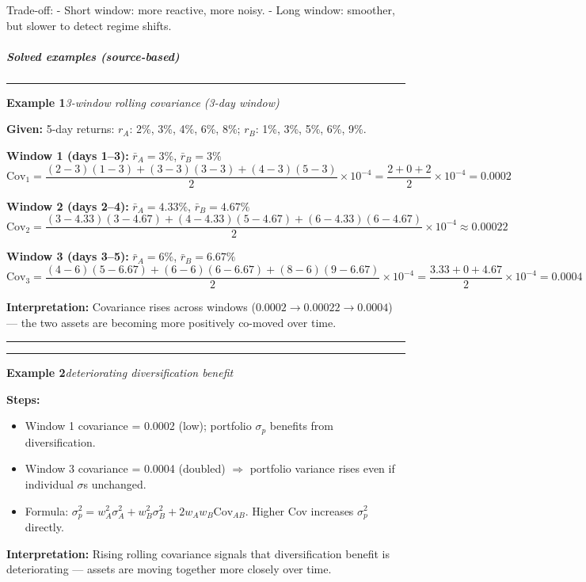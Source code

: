 \documentclass[
]{article}
\begin{document}
Trade-off: - Short window: more reactive, more noisy. - Long window:
smoother, but slower to detect regime shifts.

\hypertarget{solved-examples-source-based-6}{%
\subparagraph{Solved examples
(source-based)}\label{solved-examples-source-based-6}}



\medskip
\noindent\rule{\linewidth}{0.4pt}
\noindent\textbf{Example 1}\enspace\textit{3-window rolling covariance (3-day window)}

\noindent\textbf{Given:} 5-day returns: $r_A$: 2\%, 3\%, 4\%, 6\%, 8\%; $r_B$: 1\%, 3\%, 5\%, 6\%, 9\%.

\noindent\textbf{Window 1 (days 1--3):} $\bar{r}_A=3\%$, $\bar{r}_B=3\%$
\[
\text{Cov}_1 = \frac{(2-3)(1-3)+(3-3)(3-3)+(4-3)(5-3)}{2}\times10^{-4}
= \frac{2+0+2}{2}\times10^{-4} = 0.0002
\]

\noindent\textbf{Window 2 (days 2--4):} $\bar{r}_A=4.33\%$, $\bar{r}_B=4.67\%$
\[
\text{Cov}_2 = \frac{(3-4.33)(3-4.67)+(4-4.33)(5-4.67)+(6-4.33)(6-4.67)}{2}\times10^{-4} \approx 0.00022
\]

\noindent\textbf{Window 3 (days 3--5):} $\bar{r}_A=6\%$, $\bar{r}_B=6.67\%$
\[
\text{Cov}_3 = \frac{(4-6)(5-6.67)+(6-6)(6-6.67)+(8-6)(9-6.67)}{2}\times10^{-4}
= \frac{3.33+0+4.67}{2}\times10^{-4} = 0.0004
\]

\noindent\textbf{Interpretation:} Covariance rises across windows ($0.0002 \to 0.00022 \to 0.0004$) --- the two assets are becoming more positively co-moved over time.

\noindent\rule{\linewidth}{0.4pt}
\medskip
\noindent\rule{\linewidth}{0.4pt}
\noindent\textbf{Example 2}\enspace\textit{deteriorating diversification benefit}

\noindent\textbf{Steps:}
\begin{itemize}\setlength{\itemsep}{3pt}
  \item Window 1 covariance = 0.0002 (low); portfolio $\sigma_p$ benefits from diversification.
  \item Window 3 covariance = 0.0004 (doubled) $\Rightarrow$ portfolio variance rises even if individual $\sigma$s unchanged.
  \item Formula: $\sigma_p^2 = w_A^2\sigma_A^2 + w_B^2\sigma_B^2 + 2w_Aw_B\text{Cov}_{AB}$. Higher Cov increases $\sigma_p^2$ directly.
\end{itemize}

\noindent\textbf{Interpretation:} Rising rolling covariance signals that diversification benefit is deteriorating --- assets are moving together more closely over time.
\end{document}
